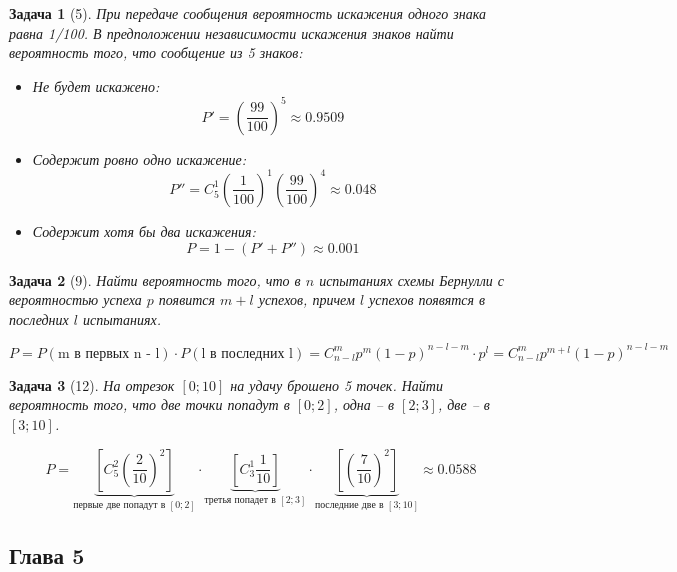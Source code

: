 \documentclass{article}
\theoremstyle{problemstyle}
\newtheorem{problem}{Задача}[section]
\begin{document}
\begin{problem}[5]
    При передаче сообщения вероятность искажения одного знака
    равна 1/100. В предположении независимости искажения
    знаков найти вероятность того, что сообщение из 5 знаков:

    \begin{itemize}
        \item Не будет искажено:
            \[ P' = \left(\frac{99}{100}\right)^5 \approx 0.9509 \]
        \item Содержит ровно одно искажение:
            \[ P'' = C_5^1 \left(\frac{1}{100}\right)^1 \left(\frac{99}{100}\right)^4 \approx 0.048  \]
        \item Содержит хотя бы два искажения:
            \[ P = 1 - (P' + P'') \approx 0.001 \]
    \end{itemize}
\end{problem}

\begin{problem}[9]
    Найти вероятность того, что в $n$ испытаниях
    схемы Бернулли с вероятностью успеха $p$ появится $m+l$ успехов,
    причем $l$ успехов появятся в последних $l$ испытаниях.

    \[
        P =
        P(\text{m в первых n - l}) \cdot P(\text{l в последних l}) = 
        C_{n-l}^m p^{m}   (1-p)^{n - l - m} \cdot p^l =
        C_{n-l}^m p^{m+l} (1-p)^{n - l -m}
    \]
\end{problem}

\begin{problem}[12]
    На отрезок $[0; 10]$ на удачу брошено 5 точек.
    Найти вероятность того, что две точки попадут в $[0; 2]$, одна
    -- в $[2; 3]$, две -- в $[3; 10]$.

    \[ P =
        \underbrace{\left[ C_5^2 \left(\frac{2}{10}\right)^2 \right]}_{\text{первые две попадут в } [0; 2]} \cdot
        \underbrace{\left[ C_3^1 \frac{1}{10} \right]}_{\text{третья попадет в } [2; 3]} \cdot
        \underbrace{\left[ \left(\frac{7}{10}\right)^2 \right]}_{\text{последние две в } [3; 10]}
        \approx 0.0588
    \]
\end{problem}

\subsection{Глава 5}
\end{document}
